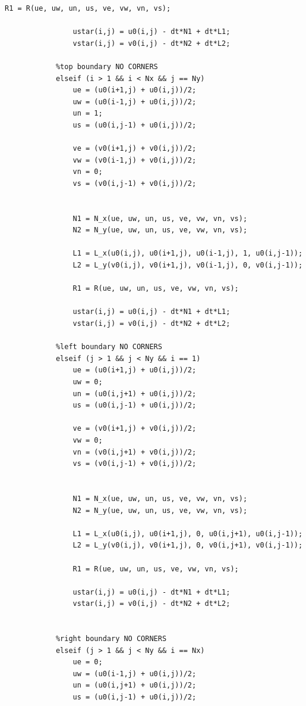 \documentclass{article}
\begin{document}
\begin{itemize}
\begin{center}
\begin{lstlisting}[style = Matlab-editor]
                R1 = R(ue, uw, un, us, ve, vw, vn, vs);

                ustar(i,j) = u0(i,j) - dt*N1 + dt*L1;
                vstar(i,j) = v0(i,j) - dt*N2 + dt*L2;

            %top boundary NO CORNERS
            elseif (i > 1 && i < Nx && j == Ny)
                ue = (u0(i+1,j) + u0(i,j))/2;
                uw = (u0(i-1,j) + u0(i,j))/2;
                un = 1;
                us = (u0(i,j-1) + u0(i,j))/2;

                ve = (v0(i+1,j) + v0(i,j))/2;
                vw = (v0(i-1,j) + v0(i,j))/2;
                vn = 0;
                vs = (v0(i,j-1) + v0(i,j))/2;

                
                N1 = N_x(ue, uw, un, us, ve, vw, vn, vs);
                N2 = N_y(ue, uw, un, us, ve, vw, vn, vs);

                L1 = L_x(u0(i,j), u0(i+1,j), u0(i-1,j), 1, u0(i,j-1));
                L2 = L_y(v0(i,j), v0(i+1,j), v0(i-1,j), 0, v0(i,j-1));

                R1 = R(ue, uw, un, us, ve, vw, vn, vs);

                ustar(i,j) = u0(i,j) - dt*N1 + dt*L1;
                vstar(i,j) = v0(i,j) - dt*N2 + dt*L2;
            
            %left boundary NO CORNERS
            elseif (j > 1 && j < Ny && i == 1)
                ue = (u0(i+1,j) + u0(i,j))/2;
                uw = 0;
                un = (u0(i,j+1) + u0(i,j))/2;
                us = (u0(i,j-1) + u0(i,j))/2;

                ve = (v0(i+1,j) + v0(i,j))/2;
                vw = 0;
                vn = (v0(i,j+1) + v0(i,j))/2;
                vs = (v0(i,j-1) + v0(i,j))/2;

                
                N1 = N_x(ue, uw, un, us, ve, vw, vn, vs);
                N2 = N_y(ue, uw, un, us, ve, vw, vn, vs);

                L1 = L_x(u0(i,j), u0(i+1,j), 0, u0(i,j+1), u0(i,j-1));
                L2 = L_y(v0(i,j), v0(i+1,j), 0, v0(i,j+1), v0(i,j-1));

                R1 = R(ue, uw, un, us, ve, vw, vn, vs);

                ustar(i,j) = u0(i,j) - dt*N1 + dt*L1;
                vstar(i,j) = v0(i,j) - dt*N2 + dt*L2;


            %right boundary NO CORNERS
            elseif (j > 1 && j < Ny && i == Nx)
                ue = 0;
                uw = (u0(i-1,j) + u0(i,j))/2;
                un = (u0(i,j+1) + u0(i,j))/2;
                us = (u0(i,j-1) + u0(i,j))/2;


\end{lstlisting}
\end{center}
\end{itemize}
\end{document}
